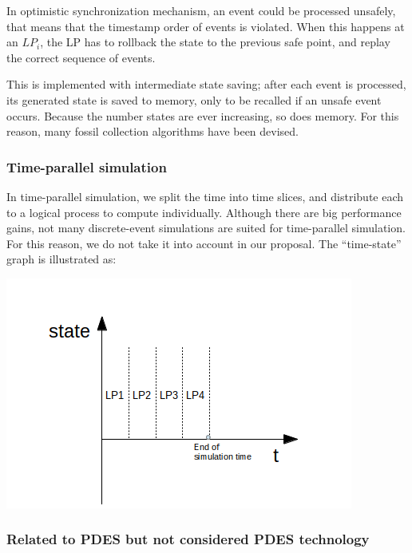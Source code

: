 \documentclass[a4paper]{article}
\begin{document}
In optimistic synchronization mechanism, an event could be processed unsafely, that
means that the timestamp order of events is violated. When this happens at an $LP_i$, the LP
has to rollback the state to the previous safe point, and replay the correct sequence
of events.

This is implemented with intermediate state saving; after each event is processed,
its generated state is saved to memory, only to be recalled if an unsafe event occurs.
Because the number states are ever increasing, so does memory. For this reason,
many fossil collection algorithms have been devised.

\subsubsection{Time-parallel simulation}

In time-parallel simulation, we split the time into time slices, and
distribute each to a logical process to compute individually. Although
there are big performance gains, not many discrete-event simulations are suited for
time-parallel simulation. For this reason, we do not take it into account in our proposal.
The ``time-state'' graph is illustrated as:

\includegraphics{thesis-proposal-time-graph}

\subsubsection{Related to PDES but not considered PDES technology}
\end{document}
